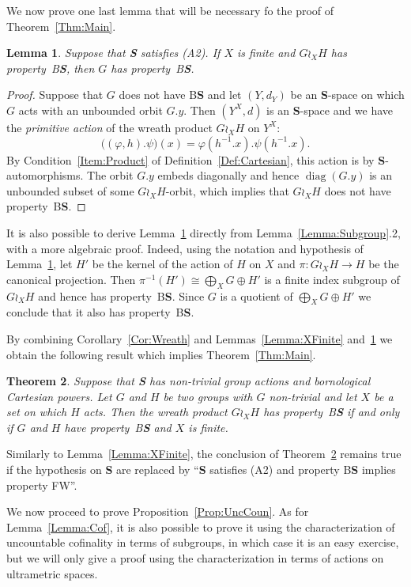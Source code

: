 \documentclass[a4paper]{article}
\newtheorem{lem}{Lemma}[section]
\newtheorem{thm}[lem]{Theorem}
\theoremstyle{definition}
\DeclareMathOperator\diag{diag}
\newcommand*{\category}[1]{\textbf{#1}}
\newcommand*{\CatS}{\category{S}}
\newcommand*{\BS}{B\textbf{S}}
\newcommand*{\FW}{FW}
\begin{document}
%
%
We now prove one last lemma that will be necessary fo the proof of Theorem~\ref{Thm:Main}.
%
%
\begin{lem}\label{Lemma:Unboundedness}
Suppose that \CatS{} satisfies (A2). If $X$ is finite and $G\wr_XH$ has property~\BS, then $G$ has property~\BS.
\end{lem}
\begin{proof}
Suppose that $G$ does not have \BS{} and let $(Y,d_Y)$ be an \CatS-space on which $G$ acts with an unbounded orbit $G.y$.
Then $(Y^X,d)$ is an \CatS-space and we have the \emph{primitive action} of the wreath product $G\wr_XH$ on $Y^X$:
\[
	\bigl((\varphi,h).\psi\bigr)(x)=\varphi(h^{-1}.x).\psi(h^{-1}.x).
\]
By Condition~\ref{Item:Product} of Definition~\ref{Def:Cartesian}, this action is by \CatS-automorphisms.
The orbit $G.y$ embeds diagonally and hence $\diag(G.y)$ is an unbounded subset of some $G\wr_XH$-orbit, which implies that $G\wr_XH$ does not have property~\BS.
\end{proof}
%
%
It is also possible to derive Lemma~\ref{Lemma:Unboundedness} directly from Lemma~\ref{Lemma:Subgroup}.2, with a more algebraic proof.
Indeed, using the notation and hypothesis of Lemma~\ref{Lemma:Unboundedness}, let $H'$ be the kernel of the action of $H$ on $X$ and $\pi\colon G\wr_XH\to H$ be the canonical projection. Then $\pi^{-1}(H')\cong \bigoplus_XG\oplus H'$ is a finite index subgroup of $G\wr_XH$ and hence has property~\BS.
Since $G$ is a quotient of $\bigoplus_XG\oplus H'$ we conclude that it also has property~\BS.

By combining Corollary~\ref{Cor:Wreath} and Lemmas~\ref{Lemma:XFinite} and~\ref{Lemma:Unboundedness} we obtain the following result which implies Theorem~\ref{Thm:Main}.
%
%
\begin{thm}\label{Thm:Technic}
Suppose that \CatS{} has non-trivial group actions and bornological  Cartesian powers.
Let $G$ and $H$ be two groups with $G$ non-trivial and let $X$ be a set on which $H$ acts. Then the wreath product $G \wr_X H$ has property~\BS{} if and only if $G$ and $H$ have property~\BS{} and $X$ is finite.
\end{thm}
%
%
Similarly to Lemma~\ref{Lemma:XFinite}, the conclusion of Theorem~\ref{Thm:Technic} remains true if the hypothesis on \CatS{} are replaced  by ``\CatS{} satisfies (A2) and property \BS{} implies property \FW''.

We now proceed to prove Proposition~\ref{Prop:UncCoun}.
As for Lemma~\ref{Lemma:Cof}, it is also possible to prove it using the characterization of uncountable cofinality in terms of subgroups, in which case it is an easy exercise, but we will only give a proof using the characterization in terms of actions on ultrametric spaces.
\end{document}
